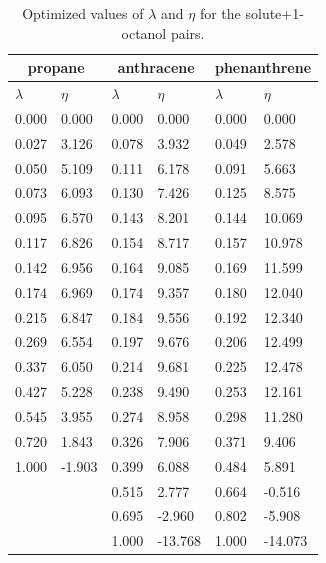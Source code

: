 \begin{table}[h]
	\centering
	\caption{Optimized values of $\lambda $ and $\eta$ for the solute+1-octanol pairs.}
	\begin{tabular}{llllll}
		\hline\hline
		\multicolumn{2}{c}{propane}& \multicolumn{2}{c}{anthracene}& \multicolumn{2}{c}{phenanthrene}\\
		\hline\hline
		$\lambda$ & $\eta$ & $\lambda$ & $\eta$  & $\lambda$ & $\eta$   \\ 
		\hline\hline
		0.000	&	0.000	&	0.000	&	0.000	&	0.000	&	0.000	\\
		0.027	&	3.126	&	0.078	&	3.932	&	0.049	&	2.578	\\
		0.050	&	5.109	&	0.111	&	6.178	&	0.091	&	5.663	\\
		0.073	&	6.093	&	0.130	&	7.426	&	0.125	&	8.575	\\
		0.095	&	6.570	&	0.143	&	8.201	&	0.144	&	10.069	\\
		0.117	&	6.826	&	0.154	&	8.717	&	0.157	&	10.978	\\
		0.142	&	6.956	&	0.164	&	9.085	&	0.169	&	11.599	\\
		0.174	&	6.969	&	0.174	&	9.357	&	0.180	&	12.040	\\
		0.215	&	6.847	&	0.184	&	9.556	&	0.192	&	12.340	\\
		0.269	&	6.554	&	0.197	&	9.676	&	0.206	&	12.499	\\
		0.337	&	6.050	&	0.214	&	9.681	&	0.225	&	12.478	\\
		0.427	&	5.228	&	0.238	&	9.490	&	0.253	&	12.161	\\
		0.545	&	3.955	&	0.274	&	8.958	&	0.298	&	11.280	\\
		0.720	&	1.843	&	0.326	&	7.906	&	0.371	&	9.406	\\
		1.000	&	-1.903	&	0.399	&	6.088	&	0.484	&	5.891	\\
		&		&	0.515	&	2.777	&	0.664	&	-0.516	\\
		&		&	0.695	&	-2.960	&	0.802	&	-5.908	\\
		&		&	1.000	&	-13.768	&	1.000	&	-14.073	\\
		
		
		\hline\hline
	\end{tabular}
\end{table}

